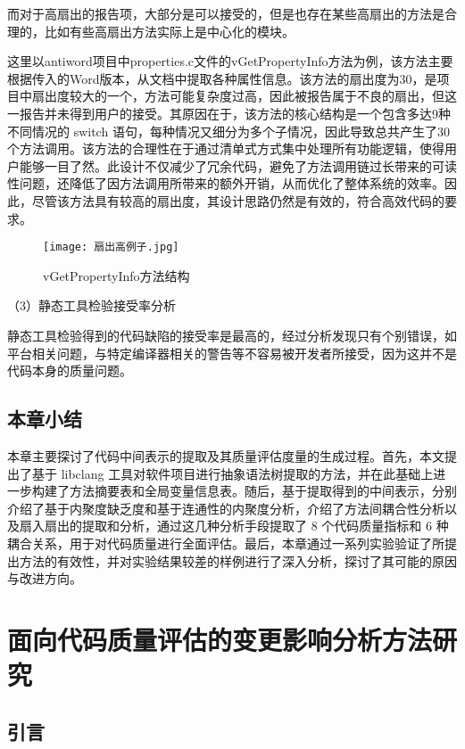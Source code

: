而对于高扇出的报告项，大部分是可以接受的，但是也存在某些高扇出的方法是合理的，比如有些高扇出方法实际上是中心化的模块。

这里以antiword项目中properties.c文件的vGetPropertyInfo方法为例，该方法主要根据传入的Word版本，从文档中提取各种属性信息。该方法的扇出度为30，是项目中扇出度较大的一个，方法可能复杂度过高，因此被报告属于不良的扇出，但这一报告并未得到用户的接受。其原因在于，该方法的核心结构是一个包含多达9种不同情况的 switch 语句，每种情况又细分为多个子情况，因此导致总共产生了30个方法调用。该方法的合理性在于通过清单式方式集中处理所有功能逻辑，使得用户能够一目了然。此设计不仅减少了冗余代码，避免了方法调用链过长带来的可读性问题，还降低了因方法调用所带来的额外开销，从而优化了整体系统的效率。因此，尽管该方法具有较高的扇出度，其设计思路仍然是有效的，符合高效代码的要求。

\begin{figure}[h]
\centering
\texttt{[image: 扇出高例子.jpg]}
\caption{vGetPropertyInfo方法结构}
\end{figure}

（3）静态工具检验接受率分析

静态工具检验得到的代码缺陷的接受率是最高的，经过分析发现只有个别错误，如平台相关问题，与特定编译器相关的警告等不容易被开发者所接受，因为这并不是代码本身的质量问题。

\section{本章小结}

本章主要探讨了代码中间表示的提取及其质量评估度量的生成过程。首先，本文提出了基于 libclang 工具对软件项目进行抽象语法树提取的方法，并在此基础上进一步构建了方法摘要表和全局变量信息表。随后，基于提取得到的中间表示，分别介绍了基于内聚度缺乏度和基于连通性的内聚度分析，介绍了方法间耦合性分析以及扇入扇出的提取和分析，通过这几种分析手段提取了 8 个代码质量指标和 6 种耦合关系，用于对代码质量进行全面评估。最后，本章通过一系列实验验证了所提出方法的有效性，并对实验结果较差的样例进行了深入分析，探讨了其可能的原因与改进方向。

\chapter{面向代码质量评估的变更影响分析方法研究}
\section{引言}

